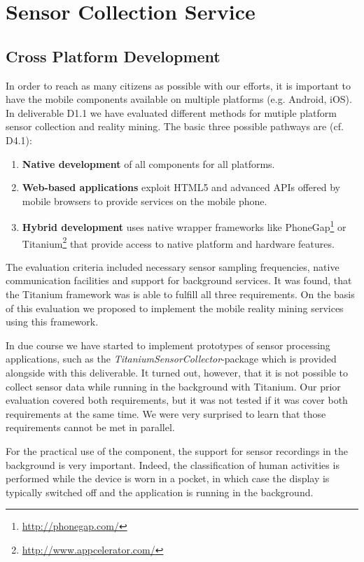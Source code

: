 \documentclass[external]{20120615_deliverable_template_ukob}
\theoremstyle{definition}
\begin{document}
\clearpage
\chapter{Sensor Collection Service}
\label{chap:sc}


\clearpage
\section{Cross Platform Development}
\label{sec:cross_platform}

In order to reach as many citizens as possible with our efforts, it is
important to have the mobile components available on multiple
platforms (e.g. Android, iOS). In deliverable D1.1 we have evaluated
different methods for mutiple platform sensor collection and reality
mining. The basic three possible pathways are (cf. D4.1):
\begin{enumerate}
\item {\bf Native development} of all components for all platforms.
\item {\bf Web-based applications} exploit HTML5 and advanced APIs
  offered by mobile browsers to provide services on the mobile phone.
\item {\bf Hybrid development} uses native wrapper frameworks like
  PhoneGap\footnote{\url{http://phonegap.com/}} or
  Titanium\footnote{\url{http://www.appcelerator.com/}} that provide
  access to native platform and hardware features.
\end{enumerate}

The evaluation criteria included necessary sensor sampling
frequencies, native communication facilities and support for
background services. It was found, that the Titanium framework was
is able to fulfill all three requirements. On the basis of this
evaluation we proposed to implement the mobile reality mining 
services using this framework.

In due course we have started to implement prototypes of sensor
processing applications, such as the {\it
  TitaniumSensorCollector}-package which is provided alongside with
this deliverable.  It turned out, however, that it is not possible to
collect sensor data while running in the background with Titanium. Our
prior evaluation covered both requirements, but it was not tested if
it was cover both requirements at the same time. We were very
surprised to learn that those requirements cannot be met in parallel.

For the practical use of the component, the support for sensor
recordings in the background is very important. Indeed, the
classification of human activities is performed while the device is
worn in a pocket, in which case the display is typically switched
off and the application is running in the background.
\end{document}
